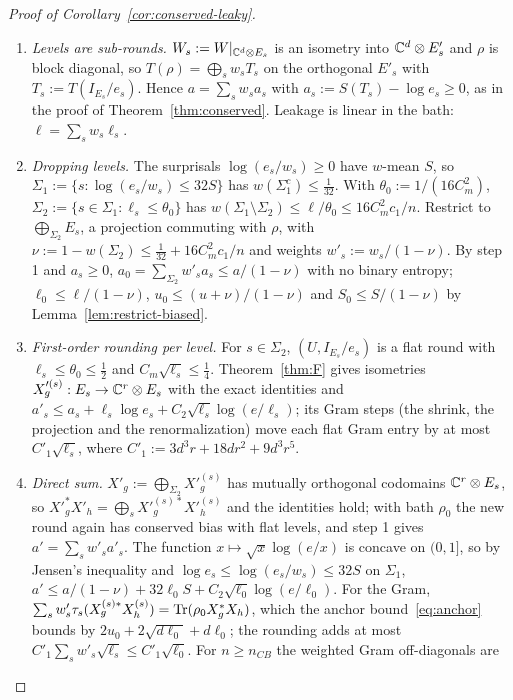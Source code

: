 \begin{proof}[Proof of Corollary~\ref{cor:conserved-leaky}]
\begin{enumerate}[label=\arabic*.,itemsep=1pt]
\item \emph{Levels are sub-rounds.} $W_s:=W|_{\mathbb C^d\otimes E_s}$ is an isometry into $\mathbb C^d\otimes E'_s$ and $\rho$ is block diagonal, so $T(\rho)=\bigoplus_sw_sT_s$ on the orthogonal
$E'_s$ with $T_s:=T(I_{E_s}/e_s)$. Hence $a=\sum_sw_sa_s$ with $a_s:=S(T_s)-\log e_s\ge0$, as in the proof of Theorem~\ref{thm:conserved}. Leakage is linear in the bath:
$\ell=\sum_sw_s\ell_s$.
\item \emph{Dropping levels.} The surprisals $\log(e_s/w_s)\ge0$ have $w$-mean $S$, so $\Sigma_1:=\{s:\log(e_s/w_s)\le32S\}$ has $w(\Sigma_1^c)\le\frac1{32}$. With
$\theta_0:=1/(16C_m^2)$, $\Sigma_2:=\{s\in\Sigma_1:\ell_s\le\theta_0\}$ has $w(\Sigma_1\setminus\Sigma_2)\le\ell/\theta_0\le16C_m^2c_1/n$. Restrict to $\bigoplus_{\Sigma_2}E_s$, a
projection commuting with $\rho$, with $\nu:=1-w(\Sigma_2)\le\frac1{32}+16C_m^2c_1/n$ and weights $w'_s:=w_s/(1-\nu)$. By step 1 and $a_s\ge0$,
$a_0=\sum_{\Sigma_2}w'_sa_s\le a/(1-\nu)$ with no binary entropy; $\ell_0\le\ell/(1-\nu)$, $u_0\le(u+\nu)/(1-\nu)$ and $S_0\le S/(1-\nu)$ by Lemma~\ref{lem:restrict-biased}.
\item \emph{First-order rounding per level.} For $s\in\Sigma_2$, $(U,I_{E_s}/e_s)$ is a flat round with $\ell_s\le\theta_0\le\frac12$ and $C_m\sqrt{\ell_s}\le\frac14$. Theorem~\ref{thm:F}
gives isometries $X'^{(s)}_g:E_s\to\mathbb C^r\otimes E_s$ with the exact identities and $a'_s\le a_s+\ell_s\log e_s+C_2\sqrt{\ell_s}\log(e/\ell_s)$; its Gram steps (the shrink, the
projection and the renormalization) move each flat Gram entry by at most $C'_1\sqrt{\ell_s}$, where $C'_1:=3d^3r+18dr^2+9d^3r^5$.
\item \emph{Direct sum.} $X'_g:=\bigoplus_{\Sigma_2}X'^{(s)}_g$ has mutually orthogonal codomains $\mathbb C^r\otimes E_s$, so $X'^*_gX'_h=\bigoplus_sX'^{(s)*}_gX'^{(s)}_h$ and the identities hold;
with bath $\rho_0$ the new round again has conserved bias with flat levels, and step 1 gives $a'=\sum_sw'_sa'_s$. The function $x\mapsto\sqrt x\log(e/x)$ is concave on
$(0,1]$, so by Jensen's inequality and $\log e_s\le\log(e_s/w_s)\le32S$ on $\Sigma_1$, $a'\le a/(1-\nu)+32\ell_0S+C_2\sqrt{\ell_0}\log(e/\ell_0)$. For the Gram,
$\sum_sw'_s\tau_s(X^{(s)*}_gX^{(s)}_h)=\operatorname{Tr}(\rho_0X_g^*X_h)$, which the anchor bound~\eqref{eq:anchor} bounds by $2u_0+2\sqrt{d\ell_0}+d\ell_0$; the rounding adds at most $C'_1\sum_sw'_s\sqrt{\ell_s}\le C'_1\sqrt{\ell_0}$. For $n\ge n_{CB}$ the weighted Gram off-diagonals are

\end{enumerate}
\end{proof}
